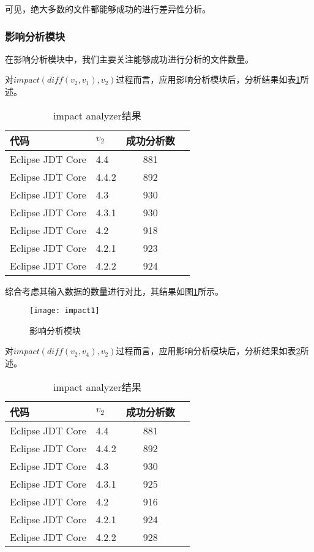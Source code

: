可见，绝大多数的文件都能够成功的进行差异性分析。



\subsubsection{影响分析模块}

在影响分析模块中，我们主要关注能够成功进行分析的文件数量。

对$impact(diff(v_2,v_1),v_2)$过程而言，应用影响分析模块后，分析结果如表\ref {data_impact_1}所述。

\begin{table}[H]
	\caption{impact analyzer结果}
	\label{data_impact_1}
	\centering
	\begin{tabular}{llcc}
		\toprule[1.5pt]
		{\heiti 代码} & {\heiti $v_2$} & {\heiti 成功分析数}  \\\midrule[1pt]
		Eclipse JDT Core & 4.4	 & 881	\\
		Eclipse JDT Core & 4.4.2 & 892 	\\
		Eclipse JDT Core & 4.3	 & 930		\\
		Eclipse JDT Core & 4.3.1 & 930 	\\
		Eclipse JDT Core & 4.2 	 &	918		\\
		Eclipse JDT Core & 4.2.1 & 923	\\
		Eclipse JDT Core & 4.2.2  & 924		\\
		\bottomrule[1.5pt]
	\end{tabular}
\end{table}

综合考虑其输入数据的数量进行对比，其结果如图\ref {impact1}所示。

\begin{figure}[H]
	\centering
	\texttt{[image: impact1]}
	\caption {影响分析模块}
	\label {impact1}	
\end{figure}

对$impact(diff(v_2,v_4),v_2)$过程而言，应用影响分析模块后，分析结果如表\ref {data_impact_2}所述。

\begin{table}[H]
	\caption{impact analyzer结果}
	\label{data_impact_2}
	\centering
	\begin{tabular}{llcc}
		\toprule[1.5pt]
		{\heiti 代码} & {\heiti $v_2$} & {\heiti 成功分析数}  \\\midrule[1pt]
		Eclipse JDT Core & 4.4	 & 881	\\
		Eclipse JDT Core & 4.4.2 & 892	 	\\
		Eclipse JDT Core & 4.3	 & 930			\\
		Eclipse JDT Core & 4.3.1 & 925	 	\\
		Eclipse JDT Core & 4.2 	 & 916			\\
		Eclipse JDT Core & 4.2.1 	 & 924		\\
		Eclipse JDT Core & 4.2.2 	 & 928		\\
		\bottomrule[1.5pt]
	\end{tabular}
\end{table}

